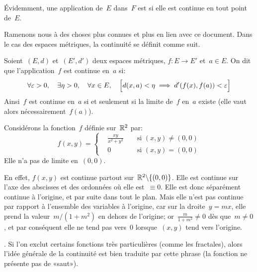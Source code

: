 
\medskip
Évidemment, une application de~$E$ dans~$F$ est  si
elle est continue en tout point de~$E$.

\medskip
Ramenons nous à des choses plus connues et plus en lien avec ce document.
Dans le cas des espaces métriques, la continuité se définit comme suit.

\begin{definition}
Soient~$(E,d)$ et~$(E',d')$ deux espaces métriques, $f: E \to E'$ et~$a \in E$.
On dit que l'application~$f$ est continue en~$a$ si:
\begin{equation}
  \forall \varepsilon > 0, \quad \exists \eta > 0, \quad \forall x \in E, \quad \Bigl[d(x,a)<\eta \implies d'(f(x),f(a))<\varepsilon\Bigr]
\end{equation}
Ainsi~$f$ est continue en~$a$ si et seulement si la limite de~$f$ en~$a$ existe
(elle vaut alors nécessairement~$f(a)$).
\end{definition}

\medskip
Considérons la fonction~$f$ définie sur~$\mathbb R^2$ par:
\begin{equation}
  f(x,y)=\left\{\begin{aligned}&\frac{xy}{x^2+y^2}&&\text{ si } (x,y)\neq(0,0) \\
&0&&\text{ si } (x,y)=(0,0) \end{aligned}\right.
\end{equation}
Elle n'a pas de limite en~$(0,0)$.

\small
En effet, $f(x,y)$ est continue partout sur~$\mathbb R^2\backslash\{(0,0)\}$.
Elle est continue sur l'axe des abscisses et des ordonnées où elle est~$\equiv0$.
Elle est donc séparément continue à l'origine, et par suite dans tout le plan.
Mais elle n'est pas continue par rapport à l'ensemble des variables à l'origine,
car sur la droite~$y=mx$, elle prend la valeur~$m/(1+m^2)$ en dehors de
l'origine; or~$\frac{m}{1+m^2}\ne0$ dès que~$m\ne0$, et par conséquent elle
ne tend pas vers~$0$ lorsque~$(x,y)$ tend vers l'origine.
\normalsize

\medskip
{}.
Si l'on exclut certains fonctions très particulières (comme les fractales), alors l'idée générale
de la continuité est bien traduite par cette phrase (la fonction ne présente pas de «saut»).

